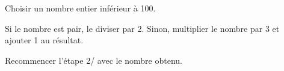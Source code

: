 \par
\begin{myenumerate}
  \item Choisir un nombre entier inférieur à 100.
  \item Si le nombre est pair, le diviser par 2. Sinon, multiplier le nombre par 3 et ajouter 1 au résultat.
  \item Recommencer l'étape 2/ avec le nombre obtenu.
\end{myenumerate}